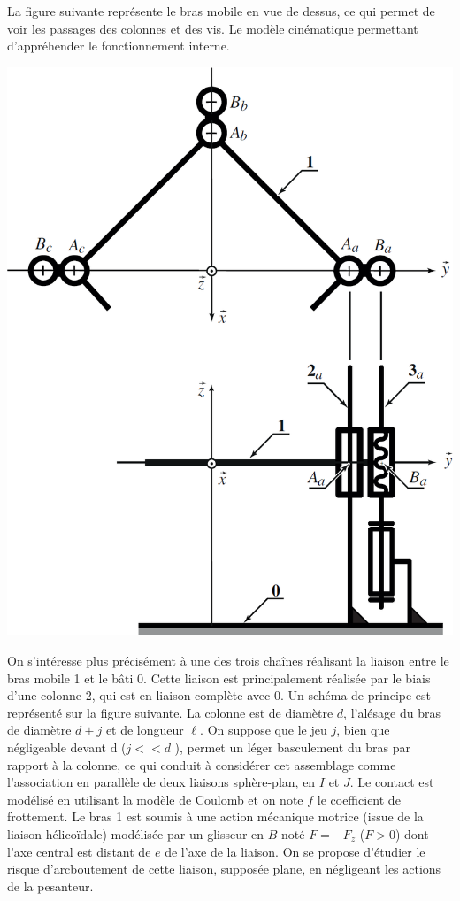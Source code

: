 \documentclass[10pt,fleqn]{article} %
\begin{document}
\begin{multicols}{2}
La figure suivante représente le bras mobile en vue de dessus, ce qui permet de voir les passages des colonnes et
des vis. Le modèle cinématique permettant d’appréhender le fonctionnement interne. 


\begin{center}
\includegraphics[width=.7\linewidth]{images/fig_04}
\end{center}





On s’intéresse plus précisément à une des trois chaînes réalisant la liaison entre le bras mobile 1 et le bâti
0. 
Cette liaison est principalement réalisée par le biais d’une colonne 2, qui est en liaison complète avec 0. Un schéma de principe est représenté sur la figure suivante. La colonne est de diamètre $d$, l’alésage du bras de diamètre
$d + j$ et  de longueur $\ell$. On suppose que le jeu $j$, bien que négligeable devant d ($j  << d$ ), permet un léger
basculement du bras par rapport à la colonne, ce qui conduit à considérer cet assemblage comme l’association en parallèle de deux liaisons sphère-plan, en $I$ et $J$. Le contact est modélisé en utilisant la modèle de Coulomb et on note $f$  le coefficient  de frottement. Le bras 1 est soumis à une action mécanique motrice (issue de la
liaison hélicoïdale) modélisée par un glisseur en $B$ noté $F = -F_z$ ($F > 0$) dont l’axe central est distant de $e$
de l’axe de la liaison. On se propose  d’étudier le risque d’arcboutement  de cette liaison, supposée plane, en négligeant les actions de la pesanteur.


\end{multicols}
\end{document}
